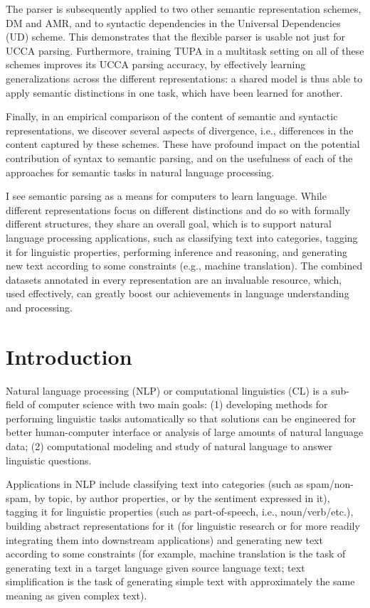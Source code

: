 \documentclass[12pt,a4paper,table]{report}
\begin{document}
The parser is subsequently applied to two other semantic representation schemes,
DM and AMR, and to syntactic dependencies in the Universal Dependencies (UD)
scheme. This demonstrates that the flexible parser is usable not just for UCCA
parsing.
Furthermore, training TUPA in a multitask setting on all of these schemes
improves its UCCA parsing accuracy, by effectively learning generalizations
across the different representations:
a shared model is thus able to apply semantic distinctions in one task,
which have been learned for another.

Finally, in an empirical comparison of
the content of semantic and syntactic representations, we discover several
aspects of divergence, i.e., differences in the content captured by these schemes.
These have profound impact on the potential
contribution of syntax to semantic parsing, and on the usefulness of each of
the approaches for semantic tasks in natural language processing.

I see semantic parsing as a means for computers to learn language.
While different representations focus on different distinctions and do so
with formally different structures, they share an overall goal,
which is to support natural language processing applications,
such as classifying text into categories,
tagging it for linguistic properties,
performing inference and reasoning,
and generating new text according to some constraints
(e.g., machine translation).
The combined datasets annotated in every representation are an invaluable
resource, which, used effectively, can greatly boost our achievements in
language understanding and processing.

\pagebreak

\tableofcontents

\chapter{Introduction}

Natural language processing (NLP) or computational linguistics (CL)
is a sub-field of computer science with two main goals:
(1) developing methods for performing linguistic tasks automatically
so that solutions can be engineered for better human-computer interface
or analysis of large amounts of natural language data;
(2) computational modeling and study of natural language to answer linguistic questions.

Applications in NLP include classifying text into categories
(such as spam/non-spam, by topic, by author properties, or by
the sentiment expressed in it),
tagging it for linguistic properties (such as part-of-speech, i.e., noun/verb/etc.),
building abstract representations for it (for linguistic research or for
more readily integrating them into downstream applications)
and generating new text according to some constraints (for example,
machine translation is the task of generating
text in a target language given source language text;
text simplification is the task of generating simple text with approximately the same
meaning as given complex text).
\end{document}
